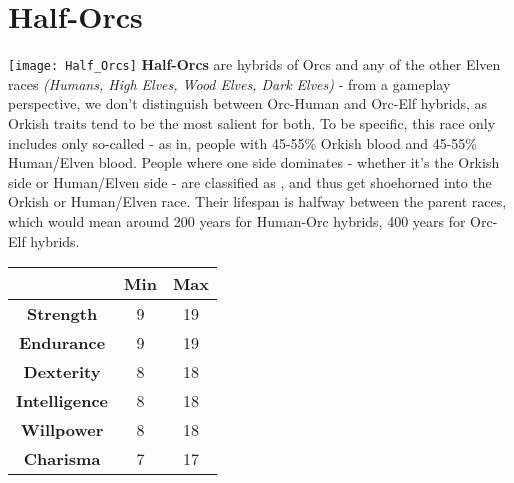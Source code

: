 \documentclass[openany,10pt,a4paper]{book}
\begin{document}
\section{Half-Orcs}
\texttt{[image: Half\_Orcs]}\newline
\textbf{Half-Orcs} are hybrids of Orcs and any of the other Elven races \textit{(Humans, High Elves, Wood Elves, Dark Elves)} - from a gameplay perspective, we don't distinguish between Orc-Human and Orc-Elf hybrids, as Orkish traits tend to be the most salient for both. To be specific, this race only includes only so-called - as in, people with 45-55\% Orkish blood and 45-55\% Human/Elven blood. People where one side dominates - whether it's the Orkish side or Human/Elven side - are classified as , and thus get shoehorned into the Orkish or Human/Elven race. Their lifespan is halfway between the parent races, which would mean around 200 years for Human-Orc hybrids, 400 years for Orc-Elf hybrids.\newline
\begin{tabular}{|c|c|c|}
\hline
 & \textbf{Min} & \textbf{Max} \\ \hline
\textbf{Strength} & 9 & 19 \\ \hline
\textbf{Endurance} & 9 & 19 \\ \hline
\textbf{Dexterity} & 8 & 18 \\ \hline
\textbf{Intelligence} & 8 & 18 \\ \hline
\textbf{Willpower} & 8 & 18 \\ \hline
\textbf{Charisma} & 7 & 17 \\ \hline
\end{tabular}\newline
{}\newpage
\end{document}
